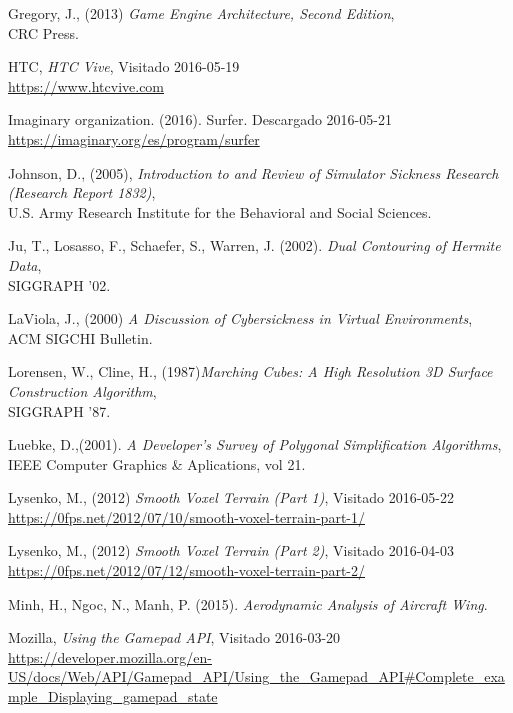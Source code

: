 \documentclass[12pt]{article}
\begin{document}
\begin{thebibliography}{9}
Gregory, J., (2013) \textit{Game Engine Architecture, Second Edition},\\
CRC Press.

HTC, \textit{HTC Vive},
Visitado 2016-05-19 
\\\url{https://www.htcvive.com}

Imaginary organization. (2016). Surfer. 
Descargado 2016-05-21 
\\\url{https://imaginary.org/es/program/surfer}

Johnson, D., (2005), \textit{Introduction to and Review of Simulator Sickness Research (Research Report 1832)},\\
U.S. Army Research Institute for the Behavioral and Social Sciences.

Ju, T., Losasso, F., Schaefer, S., Warren, J. (2002). \textit{Dual Contouring of Hermite Data},\\
SIGGRAPH '02.

LaViola, J., (2000) \textit{A Discussion of Cybersickness in Virtual Environments},\\
ACM SIGCHI Bulletin.

Lorensen, W., Cline, H., (1987)\textit{Marching Cubes: A High Resolution 3D Surface Construction Algorithm},\\
SIGGRAPH  '87.

Luebke, D.,(2001). \textit{A Developer's Survey of Polygonal Simplification Algorithms},\\
IEEE Computer Graphics \& Aplications, vol 21.

Lysenko, M., (2012) \textit{Smooth Voxel Terrain (Part 1)},
Visitado 2016-05-22
\\\url{https://0fps.net/2012/07/10/smooth-voxel-terrain-part-1/}

Lysenko, M., (2012) \textit{Smooth Voxel Terrain (Part 2)},
Visitado 2016-04-03
\\\url{https://0fps.net/2012/07/12/smooth-voxel-terrain-part-2/}

Minh, H., Ngoc, N., Manh, P. (2015). \textit{Aerodynamic Analysis of Aircraft Wing}. 

Mozilla, \textit{Using the Gamepad API},
Visitado 2016-03-20
\\\url{https://developer.mozilla.org/en-US/docs/Web/API/Gamepad_API/Using_the_Gamepad_API#Complete_example_Displaying_gamepad_state}


\end{thebibliography}
\end{document}
